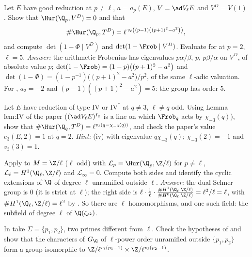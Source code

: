 \begin{exercise}\label{ex:galcoh:ex-good-prime}
Let $E$ have good reduction at $p\ne\ell$, $a=a_p(E)$, $V=\ad V_\ell E$ and $V^D=V(1)$. Show that $\Hur(\Q_p,V^D)=0$ and that
\[
\#\Hur(\Q_p,T^D)=\ell^{\,v_\ell\left((p-1)\left((p+1)^2-a^2\right)\right)},
\]
and compute $\det(1-\Phi\mid V^D)$ and $\det(1-\Frob\mid V^D)$. Evaluate for  at $p=2$, $\ell=5$. \emph{Answer:} the arithmetic Frobenius has eigenvalues
$p\alpha/\beta$, $p$, $p\beta/\alpha$ on $V^D$, of absolute value $p$; $\det(1-\Frob)=(1-p)\bigl((p+1)^2-a^2\bigr)$ and $\det(1-\Phi)=(1-p^{-1})\bigl((p+1)^2-a^2\bigr)/p^2$, of the same
$\ell$-adic valuation. For , $a_2=-2$ and $(p-1)((p+1)^2-a^2)=5$: the group has order $5$.
\end{exercise}

\begin{exercise}\label{ex:galcoh:ex-type-iv}
Let $E$ have reduction of type $\mathrm{IV}$ or $\mathrm{IV}^*$ at $q\ne3$, $\ell\ne q$ odd. Using Lemma lem:IV of the paper ($(\ad V_\ell E)^{I_q}$ is a line on which $\Frob_q$ acts by
$\chi_{-3}(q)$), show that $\#\Hur(\Q_q,T^D)=\ell^{v_\ell(q-\chi_{-3}(q))}$, and check the paper's value $e_3(E,2)=1$ at $q=2$. \emph{Hint:} (iv) with
eigenvalue $q\chi_{-3}(q)$; $\chi_{-3}(2)=-1$ and $v_3(3)=1$.
\end{exercise}

\begin{exercise}\label{ex:galcoh:ex-gw-ell}
Apply  to $M=\Z/\ell$ ($\ell$ odd) with $\mathcal L_p=\Hur(\Q_p,\Z/\ell)$ for $p\ne\ell$, $\mathcal L_\ell=H^1(\Q_\ell,\Z/\ell)$ and $\mathcal L_\infty=0$. Compute both sides
and identify the cyclic extensions of $\Q$ of degree $\ell$ unramified outside $\ell$. \emph{Answer:} the dual Selmer group is $0$ (it is strict at $\ell$); the right side is
$\ell\cdot\frac1\ell\cdot\frac{\#H^1(\Q_\ell,\Z/\ell)}{\#H^0(\Q_\ell,\Z/\ell)}=\ell^2/\ell=\ell$, with $\#H^1(\Q_\ell,\Z/\ell)=\ell^2$ by . So there are $\ell$ homomorphisms, and
one such field: the subfield of degree $\ell$ of $\Q(\zeta_{\ell^2})$.
\end{exercise}

\begin{exercise}\label{ex:galcoh:ex-two-primes}
In  take $\Sigma=\{p_1,p_2\}$, two primes different from $\ell$. Check the hypotheses of  and show that the characters of
$G_\Q$ of $\ell$-power order unramified outside $\{p_1,p_2\}$ form a group isomorphic to $\Z/\ell^{v_\ell(p_1-1)}\times\Z/\ell^{v_\ell(p_2-1)}$.
\end{exercise}

